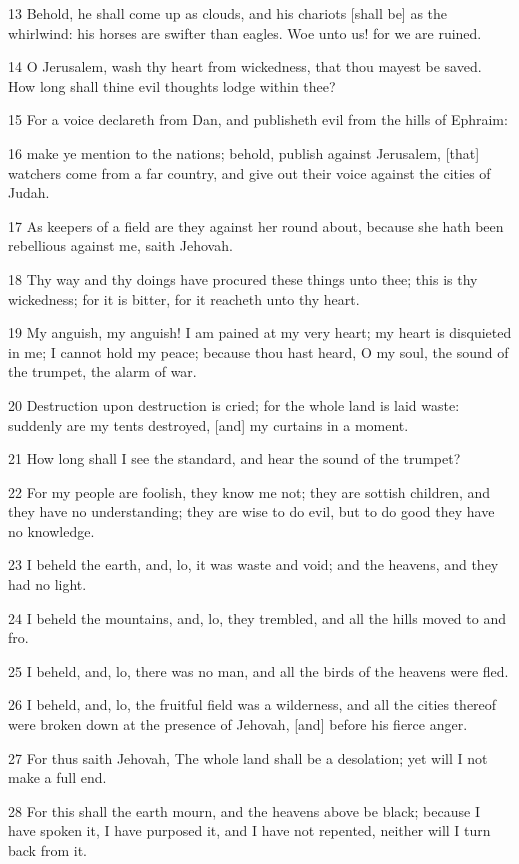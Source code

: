 \par 13 Behold, he shall come up as clouds, and his chariots [shall be] as the whirlwind: his horses are swifter than eagles. Woe unto us! for we are ruined.
\par 14 O Jerusalem, wash thy heart from wickedness, that thou mayest be saved. How long shall thine evil thoughts lodge within thee?
\par 15 For a voice declareth from Dan, and publisheth evil from the hills of Ephraim:
\par 16 make ye mention to the nations; behold, publish against Jerusalem, [that] watchers come from a far country, and give out their voice against the cities of Judah.
\par 17 As keepers of a field are they against her round about, because she hath been rebellious against me, saith Jehovah.
\par 18 Thy way and thy doings have procured these things unto thee; this is thy wickedness; for it is bitter, for it reacheth unto thy heart.
\par 19 My anguish, my anguish! I am pained at my very heart; my heart is disquieted in me; I cannot hold my peace; because thou hast heard, O my soul, the sound of the trumpet, the alarm of war.
\par 20 Destruction upon destruction is cried; for the whole land is laid waste: suddenly are my tents destroyed, [and] my curtains in a moment.
\par 21 How long shall I see the standard, and hear the sound of the trumpet?
\par 22 For my people are foolish, they know me not; they are sottish children, and they have no understanding; they are wise to do evil, but to do good they have no knowledge.
\par 23 I beheld the earth, and, lo, it was waste and void; and the heavens, and they had no light.
\par 24 I beheld the mountains, and, lo, they trembled, and all the hills moved to and fro.
\par 25 I beheld, and, lo, there was no man, and all the birds of the heavens were fled.
\par 26 I beheld, and, lo, the fruitful field was a wilderness, and all the cities thereof were broken down at the presence of Jehovah, [and] before his fierce anger.
\par 27 For thus saith Jehovah, The whole land shall be a desolation; yet will I not make a full end.
\par 28 For this shall the earth mourn, and the heavens above be black; because I have spoken it, I have purposed it, and I have not repented, neither will I turn back from it.
